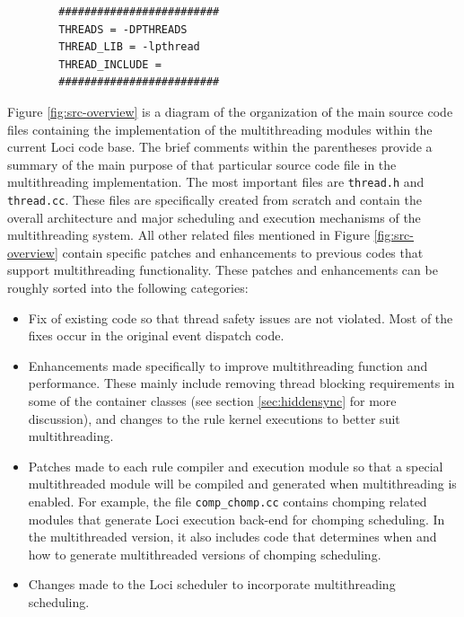 \documentclass{article}
\begin{document}
\begin{verbatim}
        #########################
        THREADS = -DPTHREADS
        THREAD_LIB = -lpthread
        THREAD_INCLUDE =
        #########################
\end{verbatim}

Figure \ref{fig:src-overview} is a diagram of the organization of the
main source code files containing the implementation of the
multithreading modules within the current Loci code base.  The brief
comments within the parentheses provide a summary of the main purpose of
that particular source code file in the multithreading implementation.
The most important files are \texttt{thread.h} and
\texttt{thread.cc}.  These files are specifically created from scratch
and contain the overall architecture and major scheduling and execution
mechanisms of the multithreading system.  All other related files
mentioned in Figure \ref{fig:src-overview} contain specific patches and
enhancements to previous codes that support multithreading
functionality.  These patches and enhancements can be roughly sorted
into the following categories:
\begin{itemize}
  \item Fix of existing code so that thread safety issues are not
    violated.  Most of the fixes occur in the original event dispatch
    code.  
  \item Enhancements made specifically to improve multithreading
    function and performance.  These mainly include removing thread
    blocking requirements in some of the container classes (see section
    \ref{sec:hiddensync} for more discussion), and changes to the rule
    kernel executions to better suit multithreading.
  \item Patches made to each rule compiler and execution module so that
    a special multithreaded module will be compiled and generated when
    multithreading is enabled.  For example, the file
    \texttt{comp\_chomp.cc} contains chomping related modules that
    generate Loci execution back-end for chomping scheduling.  In the
    multithreaded version, it also includes code that determines when
    and how to generate multithreaded versions of chomping scheduling.
  \item Changes made to the Loci scheduler to incorporate multithreading
    scheduling.
\end{itemize}
\end{document}
